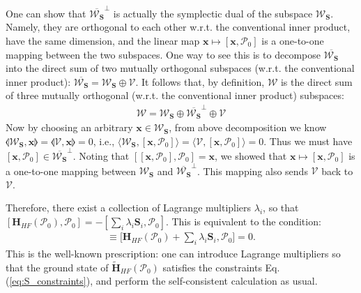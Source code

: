 \begin{subappendices}
    One can show that $\overline{\boldsymbol{\mathcal W}_{\mathbf S}}^\perp$ is actually the symplectic dual of the subspace $\boldsymbol{\mathcal W}_{\mathbf S}$. Namely, they are orthogonal to each other w.r.t. the conventional inner product, have the same dimension, and the linear map $\mathbf x\mapsto [\mathbf x,\boldsymbol{\mathcal P}_0]$ is a one-to-one mapping between the two subspaces. One way to see this is to decompose $\overline{\boldsymbol{\mathcal W}_{\mathbf S}}$ into the direct sum of two mutually orthogonal subspaces (w.r.t. the conventional inner product): $\overline{\boldsymbol{\mathcal W}_{\mathbf S}}=\boldsymbol{\mathcal W}_{\mathbf S}\oplus \boldsymbol{\mathcal V}$. It follows that, by definition, $\boldsymbol{\mathcal W}$ is the direct sum of three mutually orthogonal (w.r.t. the conventional inner product) subspaces:
    \begin{align}
        \boldsymbol{\mathcal W}=\boldsymbol{\mathcal W}_{\mathbf S}\oplus\overline{\boldsymbol{\mathcal W}_{\mathbf S}}^\perp\oplus\boldsymbol{\mathcal V}\label{eq:W_decomposition}
    \end{align}
    Now by choosing an arbitrary $\mathbf x\in \boldsymbol{\mathcal W}_{\mathbf S}$, from above decomposition we know $\llangle \boldsymbol{\mathcal W}_{\mathbf S},\mathbf x\rrangle=\llangle \boldsymbol{\mathcal V},\mathbf x\rrangle=0$, i.e., $\langle \boldsymbol{\mathcal W}_{\mathbf S},[\mathbf x,\boldsymbol{\mathcal P}_0]\rangle=\langle \boldsymbol{\mathcal V},[\mathbf x,\boldsymbol{\mathcal P}_0]\rangle=0$. Thus we must have $[\mathbf x,\boldsymbol{\mathcal P}_0]\in \overline{\boldsymbol{\mathcal W}_{\mathbf S}}^\perp$. Noting that $[[\mathbf x,\boldsymbol{\mathcal P}_0],\boldsymbol{\mathcal P}_0]=\mathbf x$, we showed that $\mathbf x\mapsto [\mathbf x,\boldsymbol{\mathcal P}_0]$ is a one-to-one mapping between $\boldsymbol{\mathcal W}_{\mathbf S}$ and $\overline{\boldsymbol{\mathcal W}_{\mathbf S}}^\perp$. This mapping also sends $\boldsymbol{\mathcal V}$ back to $\boldsymbol{\mathcal V}$.

    Therefore, there exist a collection of Lagrange multipliers $\lambda_i$, so that $[\mathbf H_{HF}(\boldsymbol{\mathcal P}_0),\boldsymbol{\mathcal P}_0]=-[\sum_i\lambda_i\mathbf S_i,\boldsymbol{\mathcal P}_0]$. This is equivalent to the condition:
    \begin{align}
        [\mathbf{\tilde H}_{HF}(\boldsymbol{\mathcal P}_0), \boldsymbol{\mathcal P}_0]\equiv\bigg[\mathbf H_{HF}(\boldsymbol{\mathcal P}_0)+\sum_i\lambda_i\mathbf S_i, \boldsymbol{\mathcal P}_0\bigg]=0.
    \end{align}
    This is the well-known prescription: one can introduce Lagrange multipliers so that the ground state of $\mathbf{\tilde H}_{HF}(\boldsymbol{\mathcal P}_0)$ satisfies the constraints Eq.(\ref{eq:S_constraints}), and perform the self-consistent calculation as usual.


\end{subappendices}

